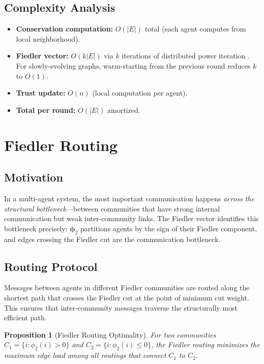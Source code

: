 \documentclass[11pt,a4paper]{article}
\newtheorem{proposition}[theorem]{Proposition}
\newcommand{\bphi}{\boldsymbol{\phi}}
\begin{document}
\subsection{Complexity Analysis}

\begin{itemize}
  \item \textbf{Conservation computation:} $O(|E|)$ total (each agent computes
        from local neighborhood).
  \item \textbf{Fiedler vector:} $O(k|E|)$ via $k$ iterations of distributed
        power iteration \citep{kempe2004distributed}.  For slowly-evolving
        graphs, warm-starting from the previous round reduces $k$ to $O(1)$.
  \item \textbf{Trust update:} $O(n)$ (local computation per agent).
  \item \textbf{Total per round:} $O(|E|)$ amortized.
\end{itemize}

\section{Fiedler Routing}
\label{sec:routing}

\subsection{Motivation}

In a multi-agent system, the most important communication happens \emph{across
the structural bottleneck}---between communities that have strong internal
communication but weak inter-community links.  The Fiedler vector identifies
this bottleneck precisely: $\bphi_2$ partitions agents by the sign of their
Fiedler component, and edges crossing the Fiedler cut are the communication
bottleneck.

\subsection{Routing Protocol}

Messages between agents in different Fiedler communities are routed along the
shortest path that crosses the Fiedler cut at the point of minimum cut weight.
This ensures that inter-community messages traverse the structurally most
efficient path.

\begin{proposition}[Fiedler Routing Optimality]
\label{prop:routing}
For two communities $C_1 = \{i : \phi_2(i) > 0\}$ and $C_2 = \{i :
\phi_2(i) \leq 0\}$, the Fiedler routing minimizes the maximum edge load
among all routings that connect $C_1$ to $C_2$.
\end{proposition}
\end{document}
